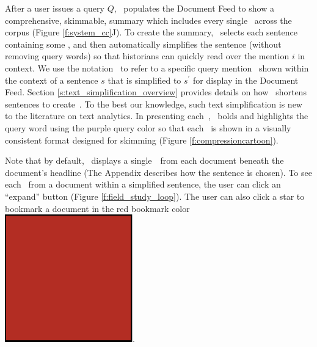 After a user issues a query $Q$, \ours~populates the Document Feed to show a comprehensive, skimmable, summary which includes every single \specificmention~across the corpus (Figure \ref{f:system_cc}J). 
To create the summary, \ours~selects each sentence containing some \specificmention, and then automatically simplifies the sentence (without removing query words) so that historians can quickly read over the mention $i$ in context.
We use the notation \simplifiedsentence~to refer to a specific query mention \specificmention~shown within the context of a sentence $s$ that is simplified to $s^\prime$ for display in the Document Feed.
Section \ref{s:text_simplification_overview} provides details on how \ours~shortens sentences to create~\simplifiedsentence. To the best our knowledge, such text simplification is new to the literature on text analytics.
In presenting each~\simplifiedsentence, \ours~bolds and highlights the query word using the purple query color so that each \simplifiedsentence~is shown in a visually consistent format designed for skimming (Figure \ref{f:compressioncartoon}). 

Note that by default, \ours~displays a single~\simplifiedsentence~from each document beneath the document's headline (The Appendix describes how the sentence is chosen).
To see each \specificmention~from a document within a simplified sentence, the user can click an ``expand'' button (Figure \ref{f:field_study_loop}). 
The user can also click a star to bookmark a document in the red bookmark color \includegraphics[scale=0.06]{figures/CCRed.pdf}.





